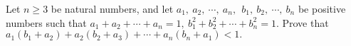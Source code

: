 Let $n\geq 3$ be natural numbers, and let $a_1,\ a_2,\ \cdots,\ a_n,\ \ b_1,\ b_2,\ \cdots,\ b_n$ be positive numbers such that $a_1+a_2+\cdots +a_n=1,\ b_1^2+b_2^2+\cdots +b_n^2=1.$ Prove that $a_1(b_1+a_2)+a_2(b_2+a_3)+\cdots +a_n(b_n+a_1) < 1.$
